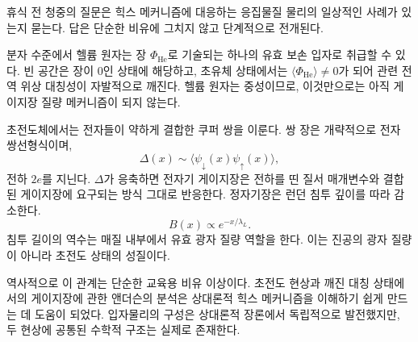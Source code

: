 휴식 전 청중의 질문은 힉스 메커니즘에 대응하는 응집물질 물리의 일상적인 사례가 있는지 묻는다. 답은 단순한 비유에 그치지 않고 단계적으로 전개된다.

\begin{classroomqa}
\end{classroomqa}

분자 수준에서 헬륨 원자는 장 \(\Phi_{\mathrm{He}}\)로 기술되는 하나의 유효 보손 입자로 취급할 수 있다. 빈 공간은 장이 0인 상태에 해당하고, 초유체 상태에서는 \(\langle\Phi_{\mathrm{He}}\rangle\ne0\)가 되어 관련 전역 위상 대칭성이 자발적으로 깨진다. 헬륨 원자는 중성이므로, 이것만으로는 아직 게이지장 질량 메커니즘이 되지 않는다.

초전도체에서는 전자들이 약하게 결합한 쿠퍼 쌍을 이룬다. 쌍 장은 개략적으로 전자 쌍선형식이며,
\begin{equation}
  \Delta(x)\sim\langle\psi_\downarrow(x)\psi_\uparrow(x)\rangle,
  \label{eq:l10-cooper-order-parameter}
\end{equation}
전하 \(2e\)를 지닌다. \(\Delta\)가 응축하면 전자기 게이지장은 전하를 띤 질서 매개변수와 결합된 게이지장에 요구되는 방식 그대로 반응한다. 정자기장은 런던 침투 깊이를 따라 감소한다.
\begin{equation}
  B(x)\propto e^{-x/\lambda_L}.
  \label{eq:l10-meissner-screening}
\end{equation}
침투 길이의 역수는 매질 내부에서 유효 광자 질량 역할을 한다. 이는 진공의 광자 질량이 아니라 초전도 상태의 성질이다.

\begin{classroomqa}
\end{classroomqa}

역사적으로 이 관계는 단순한 교육용 비유 이상이다. 초전도 현상과 깨진 대칭 상태에서의 게이지장에 관한 앤더슨의 분석은 상대론적 힉스 메커니즘을 이해하기 쉽게 만드는 데 도움이 되었다. 입자물리의 구성은 상대론적 장론에서 독립적으로 발전했지만, 두 현상에 공통된 수학적 구조는 실제로 존재한다.

